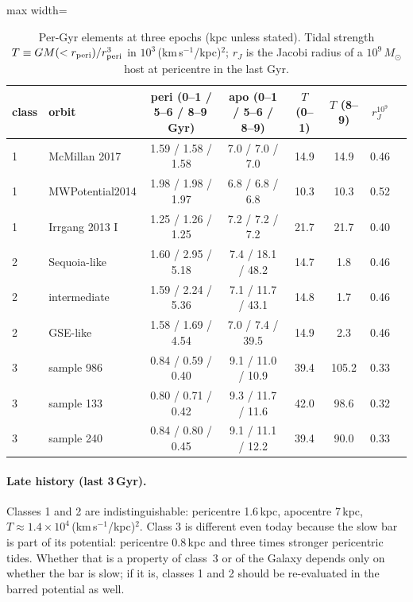 \documentclass[11pt,a4paper]{article}
\newcommand{\kms}{km\,s$^{-1}$}
\newcommand{\Msun}{M_\odot}
\begin{document}
\begin{table}[h]\centering
\caption{Per-Gyr elements at three epochs (kpc unless stated). Tidal strength $T\equiv
GM(<r_{\rm peri})/r_{\rm peri}^3$ in $10^3$\,(\kms/kpc)$^2$; $r_J$ is the Jacobi radius of a
$10^9\,\Msun$ host at pericentre in the last Gyr.}
\label{tab:cmp}
\begin{adjustbox}{max width=\linewidth}
\begin{tabular}{llcccccc}\toprule
class & orbit & peri (0--1 / 5--6 / 8--9\,Gyr) & apo (0--1 / 5--6 / 8--9) & $T$ (0--1) & $T$ (8--9) & $r_J^{10^9}$\\\midrule
1 & McMillan 2017 & 1.59 / 1.58 / 1.58 & 7.0 / 7.0 / 7.0 & 14.9 & 14.9 & 0.46\\
1 & MWPotential2014 & 1.98 / 1.98 / 1.97 & 6.8 / 6.8 / 6.8 & 10.3 & 10.3 & 0.52\\
1 & Irrgang 2013 I & 1.25 / 1.26 / 1.25 & 7.2 / 7.2 / 7.2 & 21.7 & 21.7 & 0.40\\
2 & Sequoia-like & 1.60 / 2.95 / 5.18 & 7.4 / 18.1 / 48.2 & 14.7 & 1.8 & 0.46\\
2 & intermediate & 1.59 / 2.24 / 5.36 & 7.1 / 11.7 / 43.1 & 14.8 & 1.7 & 0.46\\
2 & GSE-like & 1.58 / 1.69 / 4.54 & 7.0 / 7.4 / 39.5 & 14.9 & 2.3 & 0.46\\
3 & sample 986 & 0.84 / 0.59 / 0.40 & 9.1 / 11.0 / 10.9 & 39.4 & 105.2 & 0.33\\
3 & sample 133 & 0.80 / 0.71 / 0.42 & 9.3 / 11.7 / 11.6 & 42.0 & 98.6 & 0.32\\
3 & sample 240 & 0.84 / 0.80 / 0.45 & 9.1 / 11.1 / 12.2 & 39.4 & 90.0 & 0.33\\
\bottomrule\end{tabular}
\end{adjustbox}
\end{table}

\paragraph{Late history (last 3\,Gyr).} Classes 1 and 2 are indistinguishable: pericentre
1.6\,kpc, apocentre 7\,kpc, $T\approx1.4\times10^4$\,(\kms/kpc)$^2$. Class 3 is different even
today because the slow bar is part of its potential: pericentre 0.8\,kpc and three times
stronger pericentric tides. Whether that is a property of class~3 or of the Galaxy depends
only on whether the bar is slow; if it is, classes 1 and 2 should be re-evaluated in the
barred potential as well.
\end{document}
